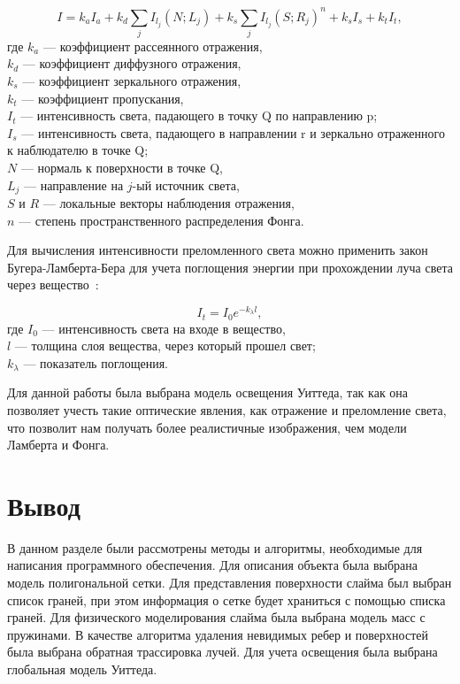 \begin{equation}\label{whitted_eq}
	I = k_a I_a + k_d \sum_{j} I_{l_j} (N; L_j) + k_s \sum_{j} I_{l_j} (S; R_j)^n + k_s I_s + k_t I_t,
\end{equation}
где $k_a$ --- коэффициент рассеянного отражения,\\
\text{~~~~~~}$k_d$ --- коэффициент диффузного отражения,\\
\text{~~~~~~}$k_s$ --- коэффициент зеркального отражения,\\
\text{~~~~~~}$k_t$ --- коэффициент пропускания,\\
\text{~~~~~~}$I_t$ --- интенсивность света, падающего в точку Q по направлению p;\\
\text{~~~~~~}$I_s$ --- интенсивность света, падающего в направлении r и зеркально отраженного к наблюдателю в точке Q;\\
\text{~~~~~~}$N$ --- нормаль к поверхности в точке Q,\\
\text{~~~~~~}$L_j$ --- направление на $j$-ый источник света,\\
\text{~~~~~~}$S$ и $R$ --- локальные векторы наблюдения отражения,\\
\text{~~~~~~}$n$ --- степень пространственного распределения Фонга.

Для вычисления интенсивности преломленного света можно применить
закон Бугера-Ламберта-Бера для учета поглощения энергии при прохождении луча
света через вещество~\cite{optics}:

\begin{equation}\label{blb}
	I_t = I_0 e^{-k_{\lambda} l},
\end{equation}
где $I_0$ --- интенсивность света на входе в вещество,\\
\text{~~~~~~}$l$ --- толщина слоя вещества, через который прошел свет;\\
\text{~~~~~~}$k_{\lambda}$ --- показатель поглощения.

Для данной работы была выбрана модель освещения Уиттеда, так как она
позволяет учесть такие оптические явления, как отражение и преломление света,
что позволит нам получать более реалистичные изображения, чем модели
Ламберта и Фонга.

\section*{Вывод}

В данном разделе были рассмотрены методы и алгоритмы, необходимые для написания программного обеспечения. Для описания объекта была выбрана модель полигональной сетки. Для представления поверхности слайма был выбран список граней, при этом информация о сетке будет храниться с помощью списка граней. Для физического моделирования слайма была выбрана модель масс с пружинами. В качестве алгоритма удаления невидимых ребер и поверхностей была выбрана обратная трассировка лучей. Для учета освещения была выбрана глобальная модель Уиттеда.

\clearpage
